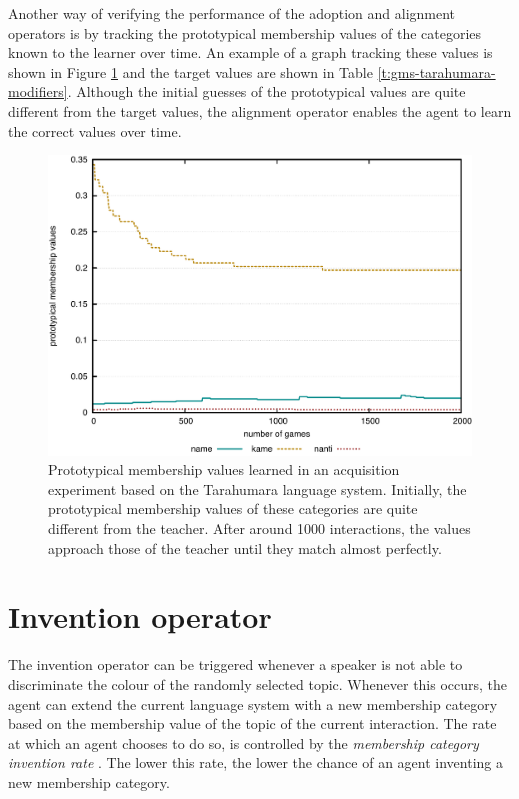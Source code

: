 Another way of verifying the performance of the adoption and alignment
operators is by tracking the prototypical membership values of the
categories known to the learner over time. An example of a graph tracking these values
is shown in Figure \ref{f:gm-acquisition-values} and the target values
are shown in Table \ref{t:gms-tarahumara-modifiers}. Although the
initial guesses of the prototypical values are quite different from
the target values, the alignment operator enables the agent to learn
the correct values over time.

\begin{figure}[htpb]
  \begin{center}
    \includegraphics[width=.9\textwidth]{./graded-membership/figures/strict-acquisition-values.pdf}
    \caption[Prototypical membership values learned in an acquisition
    experiment]{Prototypical membership values learned in an
      acquisition experiment based on the Tarahumara language
      system. Initially, the prototypical membership values of these
      categories are quite different from the teacher. After around
      1000 interactions, the values approach those of the teacher
      until they match almost perfectly.}
    \label{f:gm-acquisition-values}
  \end{center}
\end{figure}

\section{Invention operator}

The invention operator 
can be triggered whenever a
speaker is not able to discriminate the colour of the randomly selected
topic. Whenever this occurs, the agent can extend the current language
system with a new membership category based on the membership value
of the topic of the current interaction. The rate at which an agent
chooses to do so, is controlled by the \emph{membership category
  invention rate}
.
The lower this rate, the lower the chance of an agent inventing a new
membership category.

